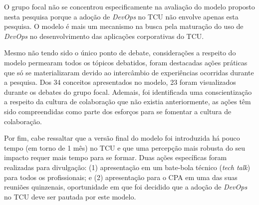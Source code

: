 O grupo focal não se concentrou especificamente na avaliação do modelo proposto
nesta pesquisa porque a adoção de {\it DevOps} no \acrshort{TCU} não envolve
apenas esta pesquisa. O modelo é mais um mecanismo na busca pela maturação do
uso de {\it DevOps} no desenvolvimento das aplicações corporativas do \acrshort{TCU}.

Mesmo não tendo sido o único ponto de debate, considerações a respeito do modelo
permearam todos os tópicos debatidos, foram destacadas ações práticas que só
se materializaram devido ao intercâmbio de experiências ocorridas durante a
pesquisa. Dos 34 conceitos apresentados no modelo, 23 foram visualizados durante
os debates do grupo focal. Ademais, foi identificada uma conscientização a
respeito da cultura de colaboração que não existia anteriormente, as ações têm
sido compreendidas como parte dos esforços para se fomentar a cultura de
colaboração.

Por fim, cabe ressaltar que a versão final do modelo foi introduzida há pouco
tempo (em torno de 1 mês) no \acrshort{TCU} e que uma percepção mais robusta
do seu impacto requer mais tempo para se formar. Duas ações específicas foram
realizadas para divulgação: (1) apresentação em um bate-bola técnico ({\it tech
talk}) para todos os profissionais; e (2) apresentação para o \acrfull{CPA} em
uma das suas reuniões quinzenais, oportunidade em que foi decidido que a
adoção de {\it DevOps} no \acrshort{TCU} deve ser pautada por este modelo.

